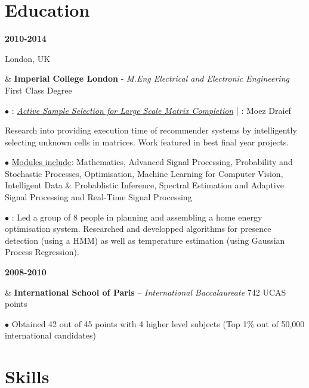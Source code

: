 \documentclass[a4paper,10pt,oneside]{article}
\begin{document}
\section*{Education}
\begin{body}

{\textbf{2010-2014} \par London, UK} & \textbf{Imperial College London} - \textit{M.Eng Electrical and Electronic Engineering} \hfill First Class Degree 



$\bullet$ \underline{}: \href{http://sg3510.github.io/al_proj/Report/thesis.pdf}{\textit{Active Sample Selection for Large Scale Matrix Completion}} | \underline{}: Moez Draief

Research into providing execution time of recommender systems by intelligently selecting unknown cells in matrices. Work featured in best final year projects.

$\bullet$ \underline{Modules include}: Mathematics, Advanced Signal Processing, Probability and Stochastic Processes, Optimisation, Machine Learning for Computer Vision, Intelligent Data \& Probablistic Inference, Spectral Estimation and Adaptive Signal Processing and Real-Time Signal Processing



$\bullet$ \underline{}: Led a group of 8 people in planning and assembling a home energy optimisation system. Researched and developped algorithms for presence detection (using a HMM) as well as temperature estimation (using Gaussian Process Regression).
\\ 
{\textbf{2008-2010} \par {} } & \textbf{International School of Paris} – \textit{International Baccalaureate} \hfill 742 UCAS points

$\bullet$ Obtained 42 out of 45 points with 4 higher level subjects (Top 1\% out of 50,000 international candidates)

\end{body}

\section*{Skills}
\end{document}
